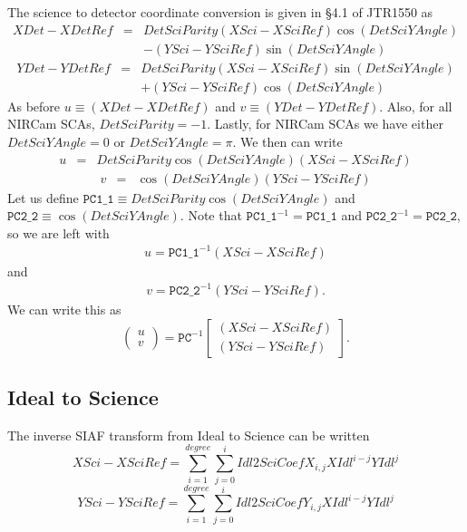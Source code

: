 \documentclass[10pt]{article}
\newcommand{\NCu}{\ensuremath{\mathtt{PC1\_1}}}
\newcommand{\NCv}{\ensuremath{\mathtt{PC2\_2}}}
\begin{document}
The science to detector coordinate conversion is given in \S 4.1 of JTR1550 as
\begin{eqnarray}
XDet - XDetRef &=& DetSciParity\left(XSci - XSciRef\right)\cos\left(DetSciYAngle\right) \nonumber\\ 
&&- \left(YSci - YSciRef\right)\sin\left(DetSciYAngle\right)\nonumber
\end{eqnarray}
\begin{eqnarray}
YDet - YDetRef &=& DetSciParity\left(XSci - XSciRef\right)\sin\left(DetSciYAngle\right) \nonumber\\
&&+ \left(YSci - YSciRef\right)\cos\left(DetSciYAngle\right)\nonumber
\end{eqnarray}
\noindent
As before $u\equiv\left(XDet - XDetRef\right)$ and $v\equiv\left(YDet - YDetRef\right)$. Also, for
all NIRCam SCAs, $DetSciParity=-1$. Lastly, for NIRCam SCAs we have either $DetSciYAngle=0$ or
$DetSciYAngle=\pi$. We then can write
\begin{eqnarray}
u &=& DetSciParity\cos\left(DetSciYAngle\right)\left(XSci - XSciRef\right)
\end{eqnarray}
\begin{eqnarray}
v &=& \cos\left(DetSciYAngle\right)\left(YSci - YSciRef\right)
\end{eqnarray}
\noindent
Let us define $\NCu \equiv DetSciParity\cos\left(DetSciYAngle\right)$ and 
$\NCv \equiv \cos\left(DetSciYAngle\right)$. Note that $\NCu^{-1} = \NCu$ 
and $\NCv^{-1} = \NCv$, so we are left with
\begin{eqnarray}
u = \NCu^{-1} (XSci - XSciRef)
\end{eqnarray}
\noindent
and
\begin{eqnarray}
v = \NCv^{-1} (YSci - YSciRef).
\end{eqnarray}
\noindent
We can write this as
\begin{equation}
\left(\begin{array}{c}u\\v\end{array}\right) = \mathtt{PC}^{-1} \left[\begin{array}{c} (XSci - XSciRef)\\(YSci - YSciRef)\end{array}\right].
\end{equation}

 \subsection{Ideal to Science}
The inverse SIAF transform from Ideal to Science can be written
\begin{equation}
\label{eqn:siaf_xsci}
XSci - XSciRef = \sum_{i=1}^{degree} \sum_{j=0}^{i} Idl2SciCoefX_{i,j}XIdl^{i-j}YIdl^j
\end{equation}
\begin{equation}
\label{eqn:siaf_ysci}
YSci - YSciRef = \sum_{i=1}^{degree} \sum_{j=0}^{i} Idl2SciCoefY_{i,j}XIdl^{i-j}YIdl^j
\end{equation} 
\end{document}
